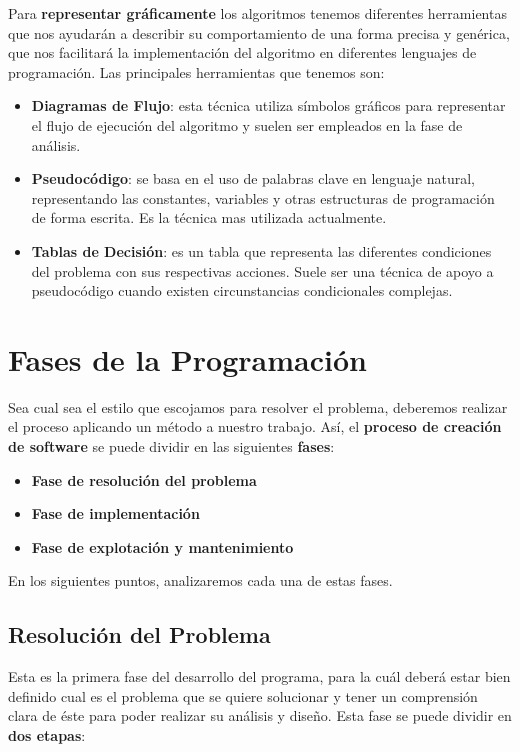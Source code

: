 Para \textbf{representar gráficamente} los algoritmos tenemos diferentes herramientas que nos ayudarán a describir su comportamiento de una forma precisa y genérica, que nos facilitará la implementación del algoritmo en diferentes lenguajes de programación. Las principales herramientas que tenemos son:

\begin{itemize}
    \item \textbf{Diagramas de Flujo}: esta técnica utiliza símbolos gráficos para representar el flujo de ejecución del algoritmo y suelen ser empleados en la fase de análisis.
    \item \textbf{Pseudocódigo}: se basa en el uso de palabras clave en lenguaje natural, representando las constantes, variables y otras estructuras de programación de forma escrita. Es la técnica mas utilizada actualmente.
    \item \textbf{Tablas de Decisión}: es un tabla que representa las diferentes condiciones del problema con sus respectivas acciones. Suele ser una técnica de apoyo a pseudocódigo cuando existen circunstancias condicionales complejas.
\end{itemize}

\section{Fases de la Programación}
Sea cual sea el estilo que escojamos para resolver el problema, deberemos realizar el proceso aplicando un método a nuestro trabajo. Así, el \textbf{proceso de creación de software} se puede dividir en las siguientes \textbf{fases}:

\begin{itemize}
    \item \textbf{Fase de resolución del problema}
    \item \textbf{Fase de implementación}
    \item \textbf{Fase de explotación y mantenimiento}
\end{itemize}

En los siguientes puntos, analizaremos cada una de estas fases.

\subsection{Resolución del Problema}
Esta es la primera fase del desarrollo del programa, para la cuál deberá estar bien definido cual es el problema que se quiere solucionar y tener un comprensión clara de éste para poder realizar su análisis y diseño. Esta fase se puede dividir en \textbf{dos etapas}:

